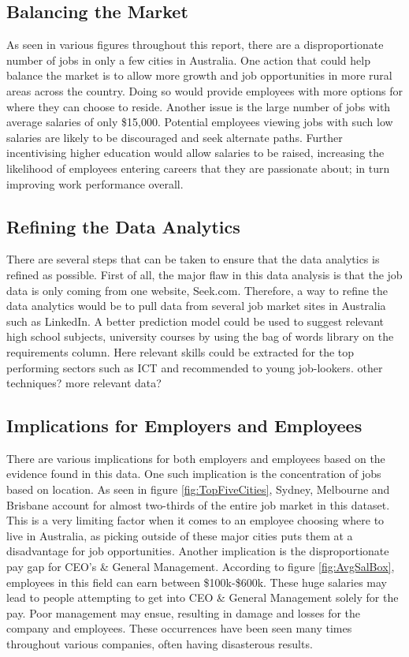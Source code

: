 \documentclass[twoside, 12pt, a4paper]{article}
\begin{document}
\subsection{Balancing the Market}

As seen in various figures throughout this report, there are a disproportionate number of jobs in only a few cities in Australia. One action that could help balance the market is to allow more growth and job opportunities in more rural areas across the country. Doing so would provide employees with more options for where they can choose to reside. Another issue is the large number of jobs with average salaries of only \$15,000. Potential employees viewing jobs with such low salaries are likely to be discouraged and seek alternate paths. Further incentivising higher education would allow salaries to be raised, increasing the likelihood of employees entering careers that they are passionate about; in turn improving work performance overall.

\newpage
\subsection{Refining the Data Analytics}

There are several steps that can be taken to ensure that the data analytics is refined as possible. First of all, the major flaw in this data analysis is that the job data is only coming from one website, Seek.com. Therefore, a way to refine the data analytics would be to pull data from several job market sites in Australia such as LinkedIn. A better prediction model could be used to suggest relevant high school subjects, university courses by using the bag of words library on the requirements column. Here relevant skills could be extracted for the top performing sectors such as ICT and recommended to young job-lookers. 
other techniques?
more relevant data? 


\subsection{Implications for Employers and Employees}

There are various implications for both employers and employees based on the evidence found in this data. One such implication is the concentration of jobs based on location. As seen in figure \ref{fig:TopFiveCities}, Sydney, Melbourne and Brisbane account for almost two-thirds of the entire job market in this dataset. This is a very limiting factor when it comes to an employee choosing where to live in Australia, as picking outside of these major cities puts them at a disadvantage for job opportunities. Another implication is the disproportionate pay gap for CEO's \& General Management. According to figure \ref{fig:AvgSalBox}, employees in this field can earn between \$100k-\$600k. These huge salaries may lead to people attempting to get into CEO \& General Management solely for the pay. Poor management may ensue, resulting in damage and losses for the company and employees. These occurrences have been seen many times throughout various companies, often having disasterous results. 
\end{document}
